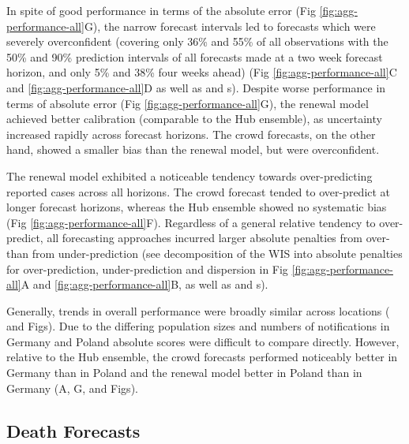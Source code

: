 \documentclass[10pt,letterpaper]{article}
\begin{document}
In spite of good performance in terms of the absolute error (Fig
\ref{fig:agg-performance-all}G), the narrow forecast intervals led to
forecasts which were severely overconfident (covering only 36\% and 55\%
of all observations with the 50\% and 90\% prediction intervals of all
forecasts made at a two week forecast horizon, and only 5\% and 38\%
four weeks ahead) (Fig \ref{fig:agg-performance-all}C and
\ref{fig:agg-performance-all}D as well as 
and s). Despite worse performance in terms of
absolute error (Fig \ref{fig:agg-performance-all}G), the renewal model
achieved better calibration (comparable to the Hub ensemble), as
uncertainty increased rapidly across forecast horizons. The crowd
forecasts, on the other hand, showed a smaller bias than the renewal
model, but were overconfident.

The renewal model exhibited a noticeable tendency towards
over-predicting reported cases across all horizons. The crowd forecast
tended to over-predict at longer forecast horizons, whereas the Hub
ensemble showed no systematic bias (Fig \ref{fig:agg-performance-all}F).
Regardless of a general relative tendency to over-predict, all
forecasting approaches incurred larger absolute penalties from over-
than from under-prediction (see decomposition of the WIS into absolute
penalties for over-prediction, under-prediction and dispersion in Fig
\ref{fig:agg-performance-all}A and \ref{fig:agg-performance-all}B, as
well as  and s).

Generally, trends in overall performance were broadly similar across
locations ( and
 Figs). Due to the differing
population sizes and numbers of notifications in Germany and Poland
absolute scores were difficult to compare directly. However, relative to
the Hub ensemble, the crowd forecasts performed noticeably better in
Germany than in Poland and the renewal model better in Poland than in
Germany (A,
G,
 and
 Figs).

\hypertarget{death-forecasts}{%
\subsection{Death Forecasts}\label{death-forecasts}}
\end{document}
